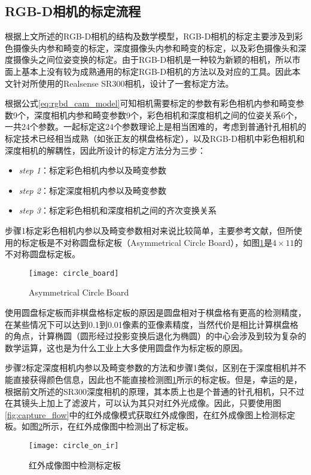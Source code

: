 \subsection{RGB-D相机的标定流程}
\label{sec:rgb-d_calibration}
根据上文所述的RGB-D相机的结构及数学模型，RGB-D相机的标定主要涉及到彩色摄像头内参和畸变的标定，深度摄像头内参和畸变的标定，以及彩色摄像头和深度摄像头之间位姿变换的标定。由于RGB-D相机是一种较为新颖的相机，所以市面上基本上没有较为成熟通用的标定RGB-D相机的方法以及对应的工具。因此本文针对所使用的Realsense SR300相机，设计了一套标定方法。

根据公式\ref{eq:rgbd_cam_model}可知相机需要标定的参数有彩色相机内参和畸变参数9个，深度相机内参和畸变参数9个，彩色相机和深度相机之间的位姿关系6个，一共24个参数。一起标定这24个参数理论上是相当困难的，考虑到普通针孔相机的标定技术已经相当成熟（如张正友的棋盘格标定\cite{Zhang2002}），以及RGB-D相机中彩色相机和深度相机的解耦性，因此所设计的标定方法分为三步：
\begin{itemize}
\item \emph{step 1}：标定彩色相机内参以及畸变参数
\item \emph{step 2}：标定深度相机内参以及畸变参数
\item \emph{step 3}：标定彩色相机和深度相机之间的齐次变换关系
\end{itemize}

步骤1标定彩色相机内参以及畸变参数相对来说比较简单，主要参考文献\cite{Zhang2002}，但所使用的标定板是不对称圆盘标定板（Asymmetrical Circle Board），如图\ref{fig:circle_board}是$4\times 11$的不对称圆盘标定板。
\begin{figure}[!ht]
  \centering
  \texttt{[image: circle\_board]}
  \caption{Asymmetrical Circle Board}
  \label{fig:circle_board}
\end{figure}
使用圆盘标定板而非棋盘格标定板的原因是圆盘相对于棋盘格有更高的检测精度，在某些情况下可以达到0.1到0.01像素的亚像素精度，当然代价是相比计算棋盘格的角点，计算椭圆（圆形经过投影变换后退化为椭圆）的中心会涉及到较为复杂的数学运算，这也是为什么工业上大多使用圆盘作为标定板的原因。

步骤2标定深度相机内参以及畸变参数的方法和步骤1类似，区别在于深度相机并不能直接获得颜色信息，因此也不能直接检测图\ref{fig:circle_board}所示的标定板。但是，幸运的是，根据前文所述的SR300深度相机的原理，其本质上也是个普通的针孔相机，只不过在其镜头上加上了滤波片，可以认为其只对红外光成像。因此，只要使用图\ref{fig:capture_flow}中的红外成像模式获取红外成像图，在红外成像图上检测标定板。如图\ref{fig:circle_on_ir}所示，在红外成像图中检测出了标定板。
\begin{figure}[!ht]
  \centering
  \texttt{[image: circle\_on\_ir]}
  \caption{红外成像图中检测标定板}
  \label{fig:circle_on_ir}
\end{figure}

